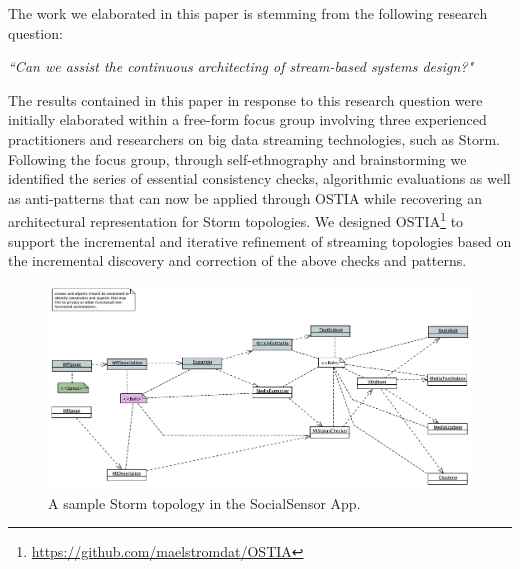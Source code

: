
The work we elaborated in this paper is stemming from the following research question:

\begin{center}
\emph{``Can we assist the continuous architecting of stream-based systems design?"}
\end{center}

The results contained in this paper in response to this research question were initially elaborated within a free-form focus group \cite{focusgroup} involving three experienced practitioners and researchers on big data streaming technologies, such as Storm. Following the focus group, through self-ethnography \cite{selfeth} and brainstorming we identified the series of essential consistency checks, algorithmic evaluations as well as anti-patterns that can now be applied through OSTIA while recovering an architectural representation for Storm topologies. We designed OSTIA\footnote{\url{https://github.com/maelstromdat/OSTIA}} to support the incremental and iterative refinement of streaming topologies based on the incremental discovery and correction of the above checks and patterns.

\begin{figure}
\includegraphics[width=\textwidth]{images/socialsensor}
\caption{A sample Storm topology in the SocialSensor App.}
\label{topo1}
\end{figure}

